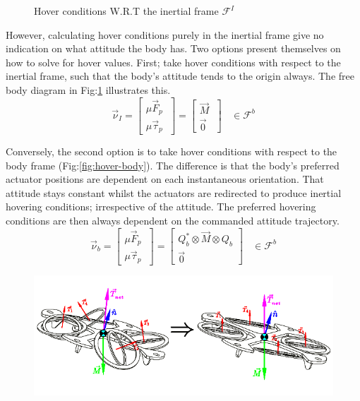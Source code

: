 {\begin{figure}[htbp]
\caption{Hover conditions W.R.T the inertial frame $\mathcal{F}^I$}
\label{fig:hover-inertial}
\end{figure}
\par
However, calculating hover conditions purely in the inertial frame give no indication on what attitude the body has. Two options present themselves on how to solve for hover values. First; take hover conditions with respect to the inertial frame, such that the body's attitude tends to the origin always. The free body diagram in Fig:\ref{fig:hover-inertial} illustrates this. 
\begin{equation}\label{eq:hover-inertial}
\vec{\nu}_I=
\begin{bmatrix}
\mu\vec{F}_p\hspace{3pt}\\
\mu\vec{\tau}_p\hspace{3pt}
\end{bmatrix}
=\begin{bmatrix}
\vec{M}\hspace{3pt}\\
\vec{0}\hspace{3pt}
\end{bmatrix}~~~~\in\mathcal{F}^b
\end{equation}
\par
Conversely, the second option is to take hover conditions with respect to the body frame (Fig:\ref{fig:hover-body}). The difference is that the body's preferred actuator positions are dependent on each instantaneous orientation. That attitude stays constant whilst the actuators are redirected to produce inertial hovering conditions; irrespective of the attitude. The preferred hovering conditions are then always dependent on the commanded attitude trajectory.
\begin{equation}\label{eq:hover-body}
\vec{\nu}_b=
\begin{bmatrix}
\mu\vec{F}_p\hspace{3pt}\\
\mu\vec{\tau}_p\hspace{3pt}
\end{bmatrix}
=\begin{bmatrix}
Q_b^*\otimes\vec{M}\otimes Q_b\\
\vec{0}
\end{bmatrix}~~~~\in\mathcal{F}^b
\end{equation}
\begin{figure}[htbp]
\centering
\includegraphics[width=\textwidth]{figs/hover-body}

\end{figure}}
